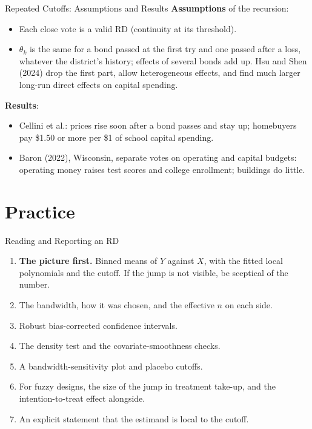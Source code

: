 \documentclass[aspectratio=169,11pt,xcolor=dvipsnames]{beamer}
\newcommand{\srct}[1]{#1}
\newcommand{\core}{\,\raisebox{0.6pt}{\textcolor{corestar}{$\bigstar$}}}
\begin{document}
\begin{frame}{Repeated Cutoffs: Assumptions and Results}
\textbf{Assumptions} of the recursion:
\begin{itemize}\itemsep2pt
  \item Each close vote is a valid RD (continuity at its threshold).
  \item $\theta_k$ is the same for a bond passed at the first try and one passed
        after a loss, whatever the district's history; effects of several bonds add up.
        \srct{Hsu and Shen (2024)} drop the first part, allow heterogeneous effects, and
        find much larger long-run direct effects on capital spending.
\end{itemize}
\vskip3pt
\textbf{Results}:
\begin{itemize}\itemsep2pt
  \item Cellini et al.: prices rise soon after a bond passes and stay up; homebuyers
        pay \$1.50 or more per \$1 of school capital spending.
  \item \srct{Baron (2022)}, Wisconsin, separate votes on operating and capital
        budgets: operating money raises test scores and college enrollment;
        buildings do little.
\end{itemize}
\end{frame}

\section[Practice]{Practice}
\begin{frame}\sectionpage\end{frame}

\begin{frame}{Reading and Reporting an RD\core}
\begin{enumerate}\itemsep2pt
  \item \textbf{The picture first.} Binned means of $Y$ against $X$, with the
        fitted local polynomials and the cutoff. If the jump is not visible, be
        sceptical of the number.
  \item The bandwidth, how it was chosen, and the effective $n$ on each side.
  \item Robust bias-corrected confidence intervals.
  \item The density test and the covariate-smoothness checks.
  \item A bandwidth-sensitivity plot and placebo cutoffs.
  \item For fuzzy designs, the size of the jump in treatment take-up, and the
        intention-to-treat effect alongside.
  \item An explicit statement that the estimand is local to the cutoff.
\end{enumerate}
\end{frame}
\end{document}
